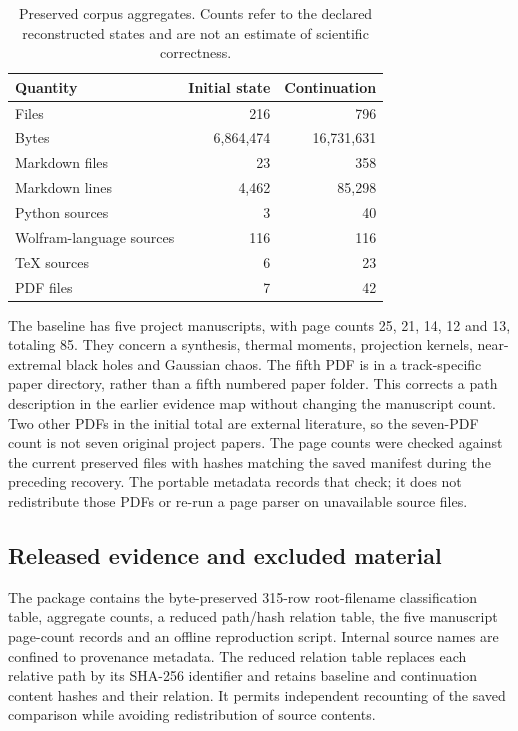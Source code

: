 \documentclass[11pt,a4paper]{article}
\begin{document}
\begin{table}[htbp]
\centering
\caption{Preserved corpus aggregates. Counts refer to the declared reconstructed
states and are not an estimate of scientific correctness.}
\label{tab:corpus}
\begin{tabular}{lrr}
\toprule
Quantity & Initial state & Continuation\\
\midrule
Files &216&796\\
Bytes &6,864,474&16,731,631\\
Markdown files &23&358\\
Markdown lines &4,462&85,298\\
Python sources &3&40\\
Wolfram-language sources &116&116\\
TeX sources &6&23\\
PDF files &7&42\\
\bottomrule
\end{tabular}
\end{table}

The baseline has five project manuscripts, with page counts 25, 21, 14, 12
and 13, totaling 85. They concern a synthesis, thermal moments, projection
kernels, near-extremal black holes and Gaussian chaos. The fifth PDF is in a
track-specific paper directory, rather than a fifth numbered paper folder.
This corrects a path description in the earlier evidence map without changing
the manuscript count. Two other PDFs in the initial total are external
literature, so the seven-PDF count is not seven original project papers.
The page counts were checked against the current preserved files with hashes
matching the saved manifest during the preceding recovery. The portable
metadata records that check; it does not redistribute those PDFs or re-run a
page parser on unavailable source files.

\subsection{Released evidence and excluded material}
The package contains the byte-preserved 315-row root-filename classification
table, aggregate counts, a reduced path/hash relation table, the five manuscript
page-count records and an offline reproduction script. Internal source names
are confined to provenance metadata. The reduced relation table replaces each
relative path by its SHA-256 identifier and retains baseline and continuation
content hashes and their relation. It permits independent recounting of the
saved comparison while avoiding redistribution of source contents.
\end{document}
